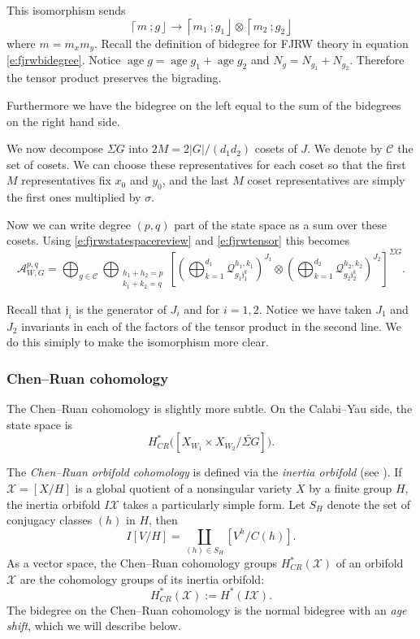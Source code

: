 \documentclass[10pt, letterpaper]{amsart}
\theoremstyle{remark}
\newcommand{\cX}{\mathcal{X}}
\newcommand{\cC}{\mathcal{C}}
\newcommand{\sA}{\mathscr{A}}
\newcommand{\sQ}{\mathscr{Q}}
\newcommand{\fjrw}[2]{ \left\lceil #1 \:; #2 \right\rfloor }
\newcommand{\jw}{\mathfrak{j}}
\newcommand{\s}[1]{\Sigma #1}
\DeclareMathOperator{\age}{age}
\begin{document}
This isomorphism sends
\[
\fjrw{m}{g}\to \fjrw{m_1}{g_1}\otimes\fjrw{m_2}{g_2}
\]
where $m=m_xm_y$. Recall the definition of bidegree for FJRW theory in equation \eqref{e:fjrwbidegree}. Notice $\age g=\age g_1+\age g_2$ and $N_g=N_{g_1}+N_{g_2}$. Therefore the tensor product preserves the bigrading.  

Furthermore we have the bidegree on the left equal to the sum of the bidegrees on the right hand side. 

We now decompose $\s{G}$ into $2M=2|G|/(d_1d_2)$ cosets of $J$. We denote by $\cC$ the set of cosets. We can choose these representatives for each coset so that the first $M$ representatives fix $x_0$ and $y_0$, and the last $M$ coset representatives are simply the first ones multiplied by $\sigma$.  %

Now we can write degree $(p,q)$ part of the state space as a sum over these cosets. Using \eqref{e:fjrwstatespacereview} and \eqref{e:fjrwtensor} this becomes
\begin{equation}\label{e:FJRWdecomposition}
\sA_{W,G}^{p,q}=\bigoplus_{g\in \cC}\bigoplus_{\substack{h_1+h_2=p\\k_1+k_2=q}}\left[\left(\bigoplus_{k=1}^{d_1}\sQ_{g_1\jw_1^k}^{h_1,k_1}\right)^{J_1}\otimes\left(\bigoplus_{k=1}^{d_2}\sQ_{g_2\jw_2^k}^{h_2,k_2}\right)^{J_2}\right]^{\s{G}}.    
\end{equation}

Recall that $\jw_i$ is the generator of $J_i$ and for $i=1,2$. Notice we have taken $J_1$ and $J_2$ invariants in each of the factors of the tensor product in the second line. We do this simiply to make the isomorphism more clear. 


\subsubsection{Chen--Ruan cohomology}
The Chen--Ruan cohomology is slightly more subtle. On the Calabi--Yau side, the state space is %
\[
H^*_{CR}\Big(\left[X_{W_1}\times X_{W_2}/\widetilde{\s{G}}\right]\Big).
\]

The \emph{Chen--Ruan orbifold cohomology} is defined via the \emph{inertia orbifold} (see \cite{ChR}).
If $\cX = [X/H]$ is a global quotient of a nonsingular
variety $X$ by a finite group $H$, the inertia orbifold $I\cX$ takes a particularly simple form.
Let $S_H$ denote the set of conjugacy classes $(h)$ in $H$,
then
\[
I [V/H] = \coprod_{(h) \in S_H} [ V^h/C(h) ].
\]
As a vector space, the Chen--Ruan cohomology groups $H^*_{CR}(\cX)$ 
of an orbifold $\cX$ are the cohomology groups of 
its inertia orbifold:
\[
H_{CR}^*(\cX) := H^*(I\cX).
\]
The bidegree on the Chen--Ruan cohomology is the normal bidegree with an \emph{age shift}, which we will describe below. 
\end{document}
